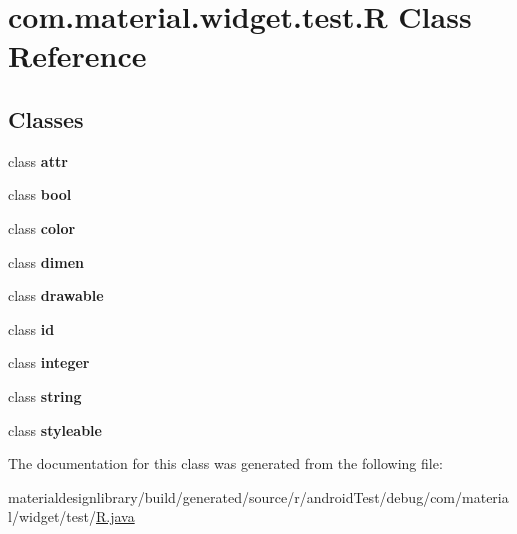 \hypertarget{classcom_1_1material_1_1widget_1_1test_1_1_r}{}\section{com.\+material.\+widget.\+test.\+R Class Reference}
\label{classcom_1_1material_1_1widget_1_1test_1_1_r}
\subsection*{Classes}
\begin{DoxyCompactItemize}
\item 
class {\bfseries attr}
\item 
class {\bfseries bool}
\item 
class {\bfseries color}
\item 
class {\bfseries dimen}
\item 
class {\bfseries drawable}
\item 
class {\bfseries id}
\item 
class {\bfseries integer}
\item 
class {\bfseries string}
\item 
class {\bfseries styleable}
\end{DoxyCompactItemize}


The documentation for this class was generated from the following file\+:\begin{DoxyCompactItemize}
\item 
materialdesignlibrary/build/generated/source/r/android\+Test/debug/com/material/widget/test/\hyperlink{materialdesignlibrary_2build_2generated_2source_2r_2android_test_2debug_2com_2material_2widget_2test_2_r_8java}{R.\+java}\end{DoxyCompactItemize}
